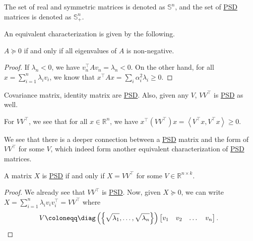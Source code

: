 \begin{notation}
	The set of real and symmetric matrices is denoted as \(\mathbb{S} ^n\), and the set of \hyperref[def:PSD]{PSD} matrices is denoted as \(\mathbb{S} ^n_+\).
\end{notation}

An equivalent characterization is given by the following.

\begin{lemma}\label{lma:PSD-non-negative-eigenvalue}
	\(A \succeq 0 \) if and only if all eigenvalues of \(A\) is non-negative.
\end{lemma}
\begin{proof}
	If \(\lambda _n < 0\), we have \(v_n ^{\top} A v_n = \lambda _n < 0\). On the other hand, for all \(x = \sum_{i=1}^n \lambda _i v_i \), we know that \(x^{\top} A x = \sum_{i} \alpha _i ^{2} \lambda _i \geq 0\).
\end{proof}

\begin{eg}
	Covariance matrix, identity matrix are \hyperref[def:PSD]{PSD}. Also, given any \(V\), \(V V^{\top} \) is \hyperref[def:PSD]{PSD} as well.
\end{eg}
\begin{explanation}
	For \(V V^{\top}\), we see that for all \(x\in \mathbb{R} ^n\), we have \(x^{\top} (V V^{\top} )x = \left\langle V^{\top} x, V^{\top} x \right\rangle \geq 0\).
\end{explanation}

We see that there is a deeper connection between a \hyperref[def:PSD]{PSD} matrix and the form of \(V V^{\top} \) for some \(V\), which indeed form another equivalent characterization of \hyperref[def:PSD]{PSD} matrices.

\begin{lemma}\label{lma:PSD}
	A matrix \(X\) is \hyperref[def:PSD]{PSD} if and only if \(X = V V^{\top} \) for some \(V\in \mathbb{R} ^{n\times k}\).
\end{lemma}
\begin{proof}
	We already see that \(V V^{\top} \) is \hyperref[def:PSD]{PSD}. Now, given \(X \succeq 0\), we can write \(X = \sum_{i=1} ^n \lambda _i v_i v_i ^{\top} = V V^{\top} \) where
	\[
		V\coloneqq \diag\left( \left\{ \sqrt{\lambda _1}, \dots , \sqrt{\lambda _n} \right\} \right)  \begin{bmatrix}
			v_1 & v_2 & \dots & v_n \\
		\end{bmatrix}.
	\]
\end{proof}

